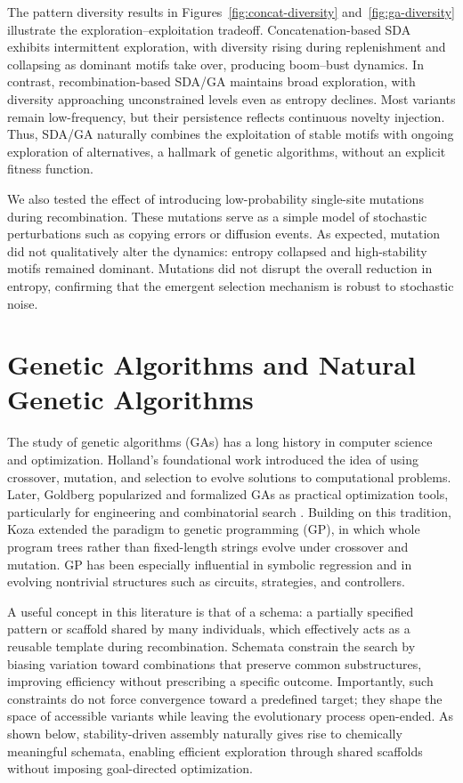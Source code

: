 \documentclass{artificial-life}
\let\cite\citep
\begin{document}
The pattern diversity results in Figures~\ref{fig:concat-diversity} and~\ref{fig:ga-diversity} illustrate the exploration–exploitation tradeoff. Concatenation-based SDA exhibits intermittent exploration, with diversity rising during replenishment and collapsing as dominant motifs take over, producing boom–bust dynamics. In contrast, recombination-based SDA/GA maintains broad exploration, with diversity approaching unconstrained levels even as entropy declines. Most variants remain low-frequency, but their persistence reflects continuous novelty injection. Thus, SDA/GA naturally combines the exploitation of stable motifs with ongoing exploration of alternatives, a hallmark of genetic algorithms, without an explicit fitness function.

We also tested the effect of introducing low-probability single-site mutations during recombination. 
These mutations serve as a simple model of stochastic perturbations such as copying errors or
diffusion events. As expected, mutation did not qualitatively alter the dynamics: entropy
collapsed and high-stability motifs remained dominant. Mutations did not disrupt the overall reduction in entropy, confirming that the emergent selection mechanism is robust to stochastic noise.

\section{Genetic Algorithms and Natural Genetic Algorithms}

The study of genetic algorithms (GAs) has a long history in computer science and optimization. 
Holland’s foundational work \cite{holland1975adaptation} introduced the idea of using crossover, 
mutation, and selection to evolve solutions to computational problems. Later, Goldberg 
\cite{goldberg1989genetic} popularized and formalized GAs as practical optimization tools, 
particularly for engineering and combinatorial search \cite{adler1993marriage}. Building on this tradition, Koza \cite{koza1992genetic} extended the paradigm to genetic programming (GP), in which whole 
program trees rather than fixed-length strings evolve under crossover and mutation. GP has 
been especially influential in symbolic regression and in evolving nontrivial structures such 
as circuits, strategies, and controllers.

A useful concept in this literature is that of a schema: a partially specified pattern or scaffold shared by many individuals, which effectively acts as a reusable template during recombination. Schemata constrain the search by biasing variation toward combinations that preserve common substructures, improving efficiency without prescribing a specific outcome. Importantly, such constraints do not force convergence toward a predefined target; they shape the space of accessible variants while leaving the evolutionary process open-ended. As shown below, stability-driven assembly naturally gives rise to chemically meaningful schemata, enabling efficient exploration through shared scaffolds without imposing goal-directed optimization.
\end{document}
